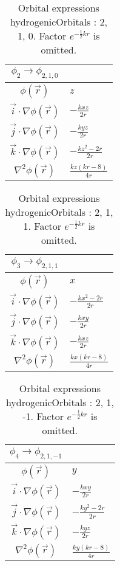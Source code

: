 \begin{table}
\begin{center}
\begin{tabular}{c|l}
$\phi_{2} \rightarrow \phi_{2, 1, 0}$\\
\hline
$\phi(\vec r)$ & $z$\\
\hline
$\vec i\cdot \nabla \phi(\vec r)$ & $- \frac{k x z}{2 r}$\\
$\vec j\cdot \nabla \phi(\vec r)$ & $- \frac{k y z}{2 r}$\\
$\vec k\cdot \nabla \phi(\vec r)$ & $- \frac{k z^{2} - 2 r}{2 r}$\\
\hline
$\nabla^2 \phi(\vec r)$ & $\frac{k z \left(k r -8\right)}{4 r}$\\
\end{tabular}
\caption{Orbital expressions hydrogenicOrbitals : 2, 1, 0. Factor $e^{- \frac{1}{2} k r}$ is omitted.}
\end{center}
\end{table}

\clearpage

\begin{table}
\begin{center}
\begin{tabular}{c|l}
$\phi_{3} \rightarrow \phi_{2, 1, 1}$\\
\hline
$\phi(\vec r)$ & $x$\\
\hline
$\vec i\cdot \nabla \phi(\vec r)$ & $- \frac{k x^{2} - 2 r}{2 r}$\\
$\vec j\cdot \nabla \phi(\vec r)$ & $- \frac{k x y}{2 r}$\\
$\vec k\cdot \nabla \phi(\vec r)$ & $- \frac{k x z}{2 r}$\\
\hline
$\nabla^2 \phi(\vec r)$ & $\frac{k x \left(k r -8\right)}{4 r}$\\
\end{tabular}
\caption{Orbital expressions hydrogenicOrbitals : 2, 1, 1. Factor $e^{- \frac{1}{2} k r}$ is omitted.}
\end{center}
\end{table}


\begin{table}
\begin{center}
\begin{tabular}{c|l}
$\phi_{4} \rightarrow \phi_{2, 1, -1}$\\
\hline
$\phi(\vec r)$ & $y$\\
\hline
$\vec i\cdot \nabla \phi(\vec r)$ & $- \frac{k x y}{2 r}$\\
$\vec j\cdot \nabla \phi(\vec r)$ & $- \frac{k y^{2} - 2 r}{2 r}$\\
$\vec k\cdot \nabla \phi(\vec r)$ & $- \frac{k y z}{2 r}$\\
\hline
$\nabla^2 \phi(\vec r)$ & $\frac{k y \left(k r -8\right)}{4 r}$\\
\end{tabular}
\caption{Orbital expressions hydrogenicOrbitals : 2, 1, -1. Factor $e^{- \frac{1}{2} k r}$ is omitted.}
\end{center}
\end{table}



% 

